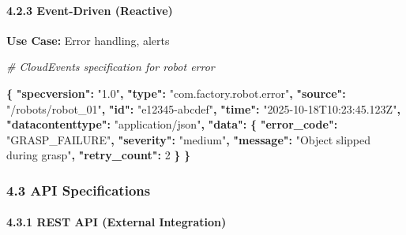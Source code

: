 \documentclass[
]{article}
\newenvironment{Shaded}{\begin{snugshade}}{\end{snugshade}}
\newcommand{\AttributeTok}[1]{\textcolor[rgb]{0.13,0.29,0.53}{#1}}
\newcommand{\CommentTok}[1]{\textcolor[rgb]{0.56,0.35,0.01}{\textit{#1}}}
\newcommand{\DecValTok}[1]{\textcolor[rgb]{0.00,0.00,0.81}{#1}}
\newcommand{\FunctionTok}[1]{\textcolor[rgb]{0.13,0.29,0.53}{\textbf{#1}}}
\newcommand{\KeywordTok}[1]{\textcolor[rgb]{0.13,0.29,0.53}{\textbf{#1}}}
\newcommand{\StringTok}[1]{\textcolor[rgb]{0.31,0.60,0.02}{#1}}
\begin{document}
\hypertarget{event-driven-reactive}{%
\paragraph{4.2.3 Event-Driven (Reactive)}\label{event-driven-reactive}}

\textbf{Use Case:} Error handling, alerts

\begin{Shaded}
\begin{Highlighting}[]
\CommentTok{\# CloudEvents specification for robot error}

\KeywordTok{\{}
\AttributeTok{  }\FunctionTok{"specversion"}\KeywordTok{:}\AttributeTok{ }\StringTok{"1.0"}\KeywordTok{,}
\AttributeTok{  }\FunctionTok{"type"}\KeywordTok{:}\AttributeTok{ }\StringTok{"com.factory.robot.error"}\KeywordTok{,}
\AttributeTok{  }\FunctionTok{"source"}\KeywordTok{:}\AttributeTok{ }\StringTok{"/robots/robot\_01"}\KeywordTok{,}
\AttributeTok{  }\FunctionTok{"id"}\KeywordTok{:}\AttributeTok{ }\StringTok{"e12345{-}abcdef"}\KeywordTok{,}
\AttributeTok{  }\FunctionTok{"time"}\KeywordTok{:}\AttributeTok{ }\StringTok{"2025{-}10{-}18T10:23:45.123Z"}\KeywordTok{,}
\AttributeTok{  }\FunctionTok{"datacontenttype"}\KeywordTok{:}\AttributeTok{ }\StringTok{"application/json"}\KeywordTok{,}
\AttributeTok{  }\FunctionTok{"data"}\KeywordTok{:}\AttributeTok{ }\KeywordTok{\{}
\AttributeTok{    }\FunctionTok{"error\_code"}\KeywordTok{:}\AttributeTok{ }\StringTok{"GRASP\_FAILURE"}\KeywordTok{,}
\AttributeTok{    }\FunctionTok{"severity"}\KeywordTok{:}\AttributeTok{ }\StringTok{"medium"}\KeywordTok{,}
\AttributeTok{    }\FunctionTok{"message"}\KeywordTok{:}\AttributeTok{ }\StringTok{"Object slipped during grasp"}\KeywordTok{,}
\AttributeTok{    }\FunctionTok{"retry\_count"}\KeywordTok{:}\AttributeTok{ }\DecValTok{2}
\AttributeTok{  }\KeywordTok{\}}
\KeywordTok{\}}
\end{Highlighting}
\end{Shaded}

\hypertarget{api-specifications}{%
\subsubsection{4.3 API Specifications}\label{api-specifications}}

\hypertarget{rest-api-external-integration}{%
\paragraph{4.3.1 REST API (External
Integration)}\label{rest-api-external-integration}}
\end{document}
